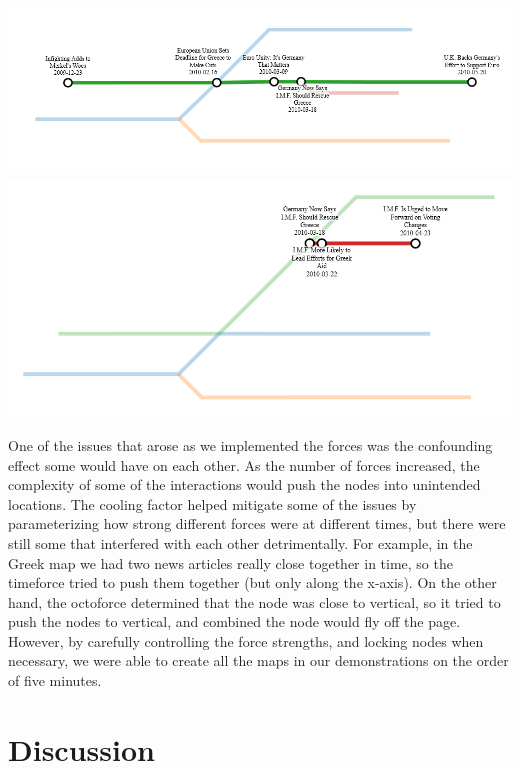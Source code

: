 \documentclass{chi2009}
\begin{document}
\includegraphics[width=\columnwidth]{Metro3.png}
\includegraphics[width=\columnwidth]{Metro4.png}

One of the issues that arose as we implemented the forces was the confounding effect some would have on each other.  As the number of forces increased, the complexity of some of the interactions would push the nodes into unintended locations.  The cooling factor helped mitigate some of the issues by parameterizing how strong different forces were at different times, but there were still some that interfered with each other detrimentally.  For example, in the Greek map we had two news articles really close together in time, so the timeforce tried to push them together (but only along the x-axis).  On the other hand, the octoforce determined that the node was close to vertical, so it tried to push the nodes to vertical, and combined the node would fly off the page.  However, by carefully controlling the force strengths, and locking nodes when necessary, we were able to create all the maps in our demonstrations on the order of five minutes.  

\section{Discussion}
\end{document}
